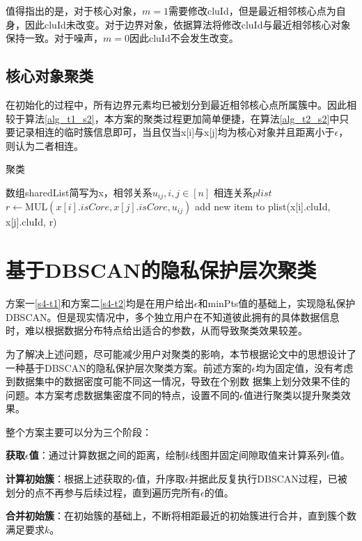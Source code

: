 值得指出的是，对于核心对象，$ m = 1 $需要修改cluId，但是最近相邻核心点为自身，因此cluId未改变。对于边界对象，依据算法将修改cluId与最近相邻核心对象保持一致。对于噪声，$ m=0 $因此cluId不会发生改变。
\subsection{核心对象聚类}
在初始化的过程中，所有边界元素均已被划分到最近相邻核心点所属簇中。因此相较于算法\ref{alg_t1_s2}，本方案的聚类过程更加简单便捷，在算法\ref{alg_t2_s2}中只要记录相连的临时簇信息即可，当且仅当x[i]与x[j]均为核心对象并且距离小于$ \epsilon $，则认为二者相连。
\begin{algorithm}[htbp]
	\renewcommand{\algorithmicrequire}{\textbf{输入:}}
	\renewcommand{\algorithmicensure}{\textbf{输出:}}
	\caption{聚类}
	\label{alg_t2_s2}
	\begin{algorithmic}[1]
		\REQUIRE 数组sharedList简写为x，相邻关系$ u_{ij},i,j\in[n] $
		\ENSURE 相连关系$ plist $
		\STATE $ r \leftarrow \text{MUL}(x[i].isCore, x[j].isCore, u_{ij}) $
		\STATE add new item to plist(x[i].cluId, x[j].cluId, r)
		\ENDFOR
		\ENDFOR
	\end{algorithmic}
\end{algorithm}
\section{基于DBSCAN的隐私保护层次聚类}
\label{s4-t3}
方案一\ref{s4-t1}和方案二\ref{s4-t2}均是在用户给出$\epsilon$和minPts值的基础上，实现隐私保护DBSCAN。但是现实情况中，多个独立用户在不知道彼此拥有的具体数据信息时，难以根据数据分布特点给出适合的参数，从而导致聚类效果较差。

为了解决上述问题，尽可能减少用户对聚类的影响，本节根据论文\cite{latifi2021dbhc}中的思想设计了一种基于DBSCAN的隐私保护层次聚类方案。前述方案的$\epsilon$均为固定值，没有考虑到数据集中的数据密度可能不同这一情况，导致在个别数 据集上划分效果不佳的问题。本方案考虑数据集密度不同的特点，设置不同的$\epsilon$值进行聚类以提升聚类效果。

整个方案主要可以分为三个阶段：
\begin{compactitem}
	\item \textbf{获取$\epsilon$值}：通过计算数据之间的距离，绘制$ k $线图并固定间隙取值来计算系列$\epsilon$值。
	\item \textbf{计算初始簇}：根据上述获取的$\epsilon$值，升序取$ \epsilon $并据此反复执行DBSCAN过程，已被划分的点不再参与后续过程，直到遍历完所有$\epsilon $的值。
	\item \textbf{合并初始簇}：在初始簇的基础上，不断将相距最近的初始簇进行合并，直到簇个数满足要求$ k $。
\end{compactitem}

